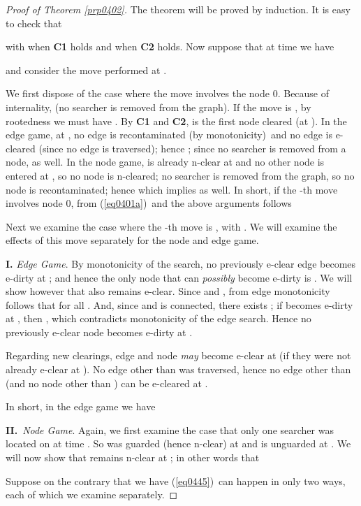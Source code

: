 \documentclass[11pt]{article}\usepackage{amsmath}
\begin{document}
\begin{proof}
[Proof of Theorem \ref{prp0402}]The theorem will be proved by induction. It is
easy to check that

with  when \textbf{C1 }holds and  when \textbf{C2} holds.
Now suppose that at time  we have

and consider the move performed at .

We first dispose of the case where the move involves the node 0. Because of
internality,  (no searcher is removed from the graph). If the move is
, by rootedness we must have . By \textbf{C1} and
\textbf{C2},  is the first node cleared (at ). In the edge game,
at , no edge is recontaminated (by monotonicity)\ and no edge is
e-cleared (since no edge is traversed); hence ; since no searcher is removed from a node,
 as well. In the
node game,  is already n-clear at  and no other node is entered
at , so no node is n-cleared; no searcher is removed from the graph, so
no node is recontaminated; hence  which implies  as well. In short, if the -th move
involves node 0, from (\ref{eq0401a})\ and the above arguments follows



Next we examine the case where the -th move is
, with . We will examine the effects of this move
separately for the node and edge game. \noindent

\noindent\textbf{I.} \emph{Edge Game}. By monotonicity of the search, no
previously e-clear edge becomes e-dirty at ; and hence the only node that
can \emph{possibly} become e-dirty is . We will show however that  also
remains e-clear. Since  and , from edge monotonicity follows that
 for all . And, since
 and
 is connected, there exists ; if  becomes e-dirty at , then , which contradicts monotonicity of the edge
search. Hence no previously e-clear node becomes e-dirty at .

Regarding new clearings, edge  and node  \emph{may} become e-clear at
 (if they were not already e-clear at ). No edge other than  was
traversed, hence no edge other than  (and no node other than ) can be
e-cleared at . \ 

In short, in the edge game we have


\noindent\textbf{II.}\ \emph{Node Game}. Again, we first examine the case that
only one searcher was located on  at time . So  was guarded (hence
n-clear) at  and is unguarded at . We will now show that  remains
n-clear at ; in other words that

Suppose on the contrary that we have
(\ref{eq0445})\ can happen in only two ways, each of which we examine separately.


\end{proof}
\end{document}
